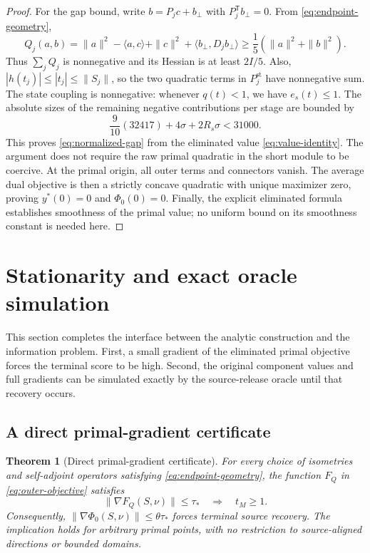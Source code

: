 \documentclass[11pt,letterpaper]{article}
\newtheorem{theorem}{Theorem}[section]
\theoremstyle{definition}
\theoremstyle{remark}
\begin{document}
\begin{proof}
For the gap bound, write $b=P_jc+b_\perp$ with
$P_j^{\mathsf T}b_\perp=0$.  From
\eqref{eq:endpoint-geometry},
\[
 Q_j(a,b)
 =\|a\|^2-\langle a,c\rangle+\|c\|^2
          +\langle b_\perp,D_jb_\perp\rangle
 \ge\frac15(\|a\|^2+\|b\|^2).
\]
Thus $\sum_jQ_j$ is nonnegative and its Hessian is at least $2I/5$.
Also, $|h(t_j)|\le|t_j|\le\|S_j\|$, so the two quadratic terms
in $P_j^{\mathrm{st}}$ have nonnegative sum.
The state coupling is nonnegative: whenever $q(t)<1$,
we have $e_s(t)\le1$.
The absolute sizes of the remaining negative contributions per stage
are bounded by
\[
 \frac9{10}(32417)+4\sigma+2R_s\sigma<31000.
\]
This proves \eqref{eq:normalized-gap} from the eliminated value
\eqref{eq:value-identity}.  The argument does not require the raw
primal quadratic in the short module to be coercive.
At the primal origin, all outer terms and connectors vanish.
The average dual objective is then a strictly concave quadratic with
unique maximizer zero, proving $y^*(0)=0$ and $\Phi_0(0)=0$.
Finally, the explicit eliminated formula establishes smoothness of
the primal value; no uniform bound on its smoothness constant is
needed here.
\end{proof}

\section{Stationarity and exact oracle simulation}
\label{app:stationarity}

This section completes the interface between the analytic construction and
the information problem. First, a small gradient of the eliminated primal
objective forces the terminal score to be high. Second, the original
component values and full gradients can be simulated exactly by the
source-release oracle until that recovery occurs.

\begin{samepage}
\subsection{A direct primal-gradient certificate}

\begin{theorem}[Direct primal-gradient certificate]
\label{thm:gradient-certificate}
For every choice of isometries and self-adjoint operators satisfying
\eqref{eq:endpoint-geometry}, the function $F_Q$ in
\eqref{eq:outer-objective} satisfies
\begin{equation}
 \|\nabla F_Q(S,\nu)\|\le\tau_*
 \quad\Longrightarrow\quad t_M\ge1.
 \label{eq:gradient-certificate}
\end{equation}
Consequently, $\|\nabla\Phi_0(S,\nu)\|\le\theta\tau_*$ forces terminal
source recovery. The implication holds for arbitrary primal points, with
no restriction to source-aligned directions or bounded domains.
\end{theorem}
\end{samepage}
\end{document}
